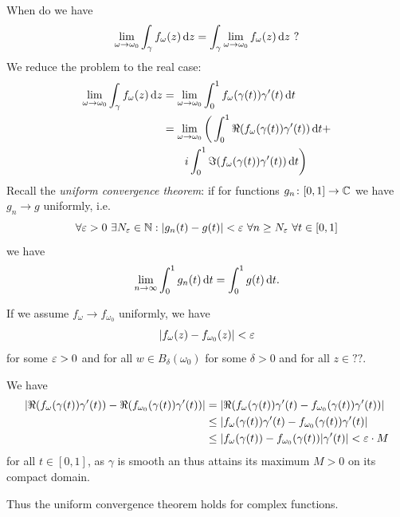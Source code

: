 \documentclass[a4paper,english]{article}
\begin{document}
When do we have
\begin{equation*}
    \lim_{\omega \to \omega_0} \int_{\gamma} f_{\omega}(z) \diff{z}
    = \int_{\gamma} \lim_{\omega \to \omega_0} f_{\omega}(z) \diff{z} \ ?
\end{equation*}
We reduce the problem to the real case:
\begin{align*}
    \lim_{\omega \to \omega_0} \int_{\gamma} f_{\omega}(z) \mathop{}\!\mathrm{d}{z}
    & = \lim_{\omega \to \omega_0} \int_{0}^{1} f_{\omega}(\gamma(t)) \gamma'(t) \mathop{}\!\mathrm{d}{t} \\
    & = \lim_{\omega \to \omega_0} \bigg(\int_{0}^{1} \Re(f_{\omega}(\gamma(t)) \gamma'(t)) \mathop{}\!\mathrm{d}{t} + \\ 
    & \qquad i \int_{0}^{1} \Im(f_{\omega}(\gamma(t)) \gamma'(t)) \mathop{}\!\mathrm{d}{t}\bigg)
\end{align*}
Recall the \emph{uniform convergence theorem}: if for functions $g_n \colon [0, 1] \to \operatorname{\mathbb{C}}$ we have $g_n \to g$ uniformly, i.e.
\begin{equation*}
    \forall \eps > 0 \ 
    \exists N_{\eps} \in \N: 
    | g_n(t) - g(t) | < \eps \ 
    \forall n \ge N_{\eps} \
    \forall t \in [0, 1]
\end{equation*}
we have 
\begin{equation*}
    \lim_{n \to \infty} \int_{0}^{1} g_n(t) \mathop{}\!\mathrm{d}{t}
    = \int_{0}^{1} g(t) \mathop{}\!\mathrm{d}{t}.
\end{equation*}

If we assume $f_{\omega} \to f_{\omega_0}$ uniformly, we have
\begin{equation*}
    | f_{\omega}(z) - f_{\omega_0}(z) | < \varepsilon
\end{equation*}
for some $\varepsilon > 0$ and for all $w \in B_{\delta}(\omega_0)$ for some $\delta > 0$ and for all $z \in ??$.

We have
\begin{align*}
    | \Re(f_{\omega}(\gamma(t)) \gamma'(t)) - \Re(f_{\omega_0}(\gamma(t)) \gamma'(t)) |
    & = | \Re(f_{\omega}(\gamma(t)) \gamma'(t) - f_{\omega_0}(\gamma(t)) \gamma'(t)) | \\
    & \le | f_{\omega}(\gamma(t)) \gamma'(t) - f_{\omega_0}(\gamma(t)) \gamma'(t) | \\
    & \le | f_{\omega}(\gamma(t)) - f_{\omega_0}(\gamma(t)) | \gamma'(t) | 
    < \varepsilon \cdot M
\end{align*}
for all $t \in [0, 1]$, as $\gamma$ is smooth an thus attains its maximum $M > 0$ on its compact domain.

Thus the uniform convergence theorem holds for complex functions.
\end{document}
